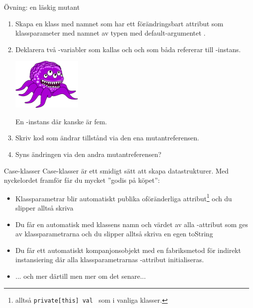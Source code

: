 \begin{Slide}{Övning: en läskig mutant}\SlideFontSmall
\begin{enumerate}
\item Skapa en klass med namnet  som har ett förändringsbart attribut som klassparameter med namnet  av typen  med default-argumentet .
\vspace{0.5em}

\item \begin{minipage}{0.5\textwidth}
Deklarera två -variabler som kallas  och  och som båda refererar till  -instans.
\end{minipage}
\hfill\begin{minipage}{0.32\textwidth}
\hfill\includegraphics[width=3.4cm]{../img/mutant.png}

En -instans där  kanske är fem.
\vspace{1em}
\end{minipage}

\item Skriv kod som ändrar tillstånd via den ena mutantreferensen.

\item Syns ändringen via den andra mutantreferensen?
\end{enumerate}
\end{Slide}




\begin{Slide}{Case-klasser}
Case-klasser är ett smidigt sätt att skapa  datastrukturer. Med nyckelordet  framför  får du mycket ''godis på köpet'':

\begin{itemize}
\item Klassparametrar blir automatiskt publika oföränderliga attribut\footnote{alltså  \texttt{private[this] val } som i vanliga klasser.} och du slipper alltså skriva 
\item Du får en automatisk  med klassens namn och värdet av alla -attribut som ges av klassparametrarna och du slipper alltså skriva en egen toString
\item Du får ett automatiskt kompanjonsobjekt med en fabriksmetod  för indirekt instansiering där alla klassparametrarnas -attribut initialiseras.
\pause
\item ... och mer därtill men mer om det senare...
\end{itemize}
\end{Slide}




